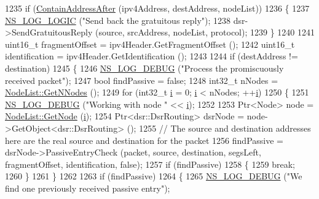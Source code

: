 \begin{DoxyCode}
1235       \textcolor{keywordflow}{if} (\hyperlink{classns3_1_1dsr_1_1DsrOptions_a96e4b43dbea2ac49309abdd0f84a9b0a}{ContainAddressAfter} (ipv4Address, destAddress, nodeList))
1236         \{
1237           \hyperlink{group__logging_ga88acd260151caf2db9c0fc84997f45ce}{NS\_LOG\_LOGIC} (\textcolor{stringliteral}{"Send back the gratuitous reply"});
1238           dsr->SendGratuitousReply (source, srcAddress, nodeList, protocol);
1239         \}
1240 
1241       uint16\_t fragmentOffset = ipv4Header.GetFragmentOffset ();
1242       uint16\_t identification = ipv4Header.GetIdentification ();
1243 
1244       \textcolor{keywordflow}{if} (destAddress != destination)
1245         \{
1246           \hyperlink{group__logging_ga413f1886406d49f59a6a0a89b77b4d0a}{NS\_LOG\_DEBUG} (\textcolor{stringliteral}{"Process the promiscuously received packet"});
1247           \textcolor{keywordtype}{bool} findPassive = \textcolor{keyword}{false};
1248           int32\_t nNodes = \hyperlink{classns3_1_1NodeList_a1d110b1670005895dd5812baab13682a}{NodeList::GetNNodes} ();
1249           \textcolor{keywordflow}{for} (int32\_t \hyperlink{bernuolliDistribution_8m_a6f6ccfcf58b31cb6412107d9d5281426}{i} = 0; \hyperlink{bernuolliDistribution_8m_a6f6ccfcf58b31cb6412107d9d5281426}{i} < nNodes; ++\hyperlink{bernuolliDistribution_8m_a6f6ccfcf58b31cb6412107d9d5281426}{i})
1250             \{
1251               \hyperlink{group__logging_ga413f1886406d49f59a6a0a89b77b4d0a}{NS\_LOG\_DEBUG} (\textcolor{stringliteral}{"Working with node "} << \hyperlink{bernuolliDistribution_8m_a6f6ccfcf58b31cb6412107d9d5281426}{i});
1252 
1253               Ptr<Node> node = \hyperlink{classns3_1_1NodeList_a80ac09977d48d29db5c704ac8483cf6c}{NodeList::GetNode} (\hyperlink{bernuolliDistribution_8m_a6f6ccfcf58b31cb6412107d9d5281426}{i});
1254               Ptr<dsr::DsrRouting> dsrNode = node->GetObject<dsr::DsrRouting> ();
1255               \textcolor{comment}{// The source and destination addresses here are the real source and destination for the
       packet}
1256               findPassive = dsrNode->PassiveEntryCheck (packet, source, destination, segsLeft, 
      fragmentOffset, identification, \textcolor{keyword}{false});
1257               \textcolor{keywordflow}{if} (findPassive)
1258                 \{
1259                   \textcolor{keywordflow}{break};
1260                 \}
1261             \}
1262 
1263           \textcolor{keywordflow}{if} (findPassive)
1264             \{
1265               \hyperlink{group__logging_ga413f1886406d49f59a6a0a89b77b4d0a}{NS\_LOG\_DEBUG} (\textcolor{stringliteral}{"We find one previously received passive entry"});

\end{DoxyCode}
